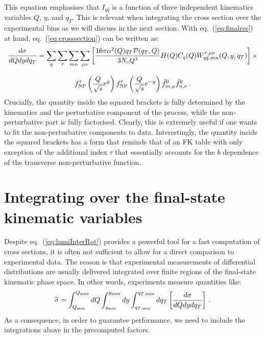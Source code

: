 \documentclass[10pt,a4paper]{article}
\begin{document}
This equation emphasises that $I_{q\bar{q}}$ is a function of three
independent kinematics variables $Q$, $y$, and $q_T$. This is relevant
when integrating the cross section over the experimental bins as we
will discuss in the next section. With eq.~(\ref{eq:finalres}) at
hand, eq.~(\ref{eq:crosssection}) can be written as:
\begin{equation}
\begin{array}{c}
\displaystyle   \frac{d\sigma}{dQ dy dq_T} =\sum_q\sum_\tau \sum_{mn}\sum_{\mu\nu}\left[
  \frac{16\pi\alpha^2(Q)q_T\mathcal{P}(q_T,Q)}{3N_c Q^3} H(Q) 
  C_q(Q) W_{q\bar{q},mn}^{\tau,\mu\nu}(Q,y,q_T)\right]\times\\
\\
\displaystyle f_{\rm NP}^\tau\left(\frac{Q}{\sqrt{s}}e^{y}\right)
  f_{\rm
  NP}^\tau\left(\frac{Q}{\sqrt{s}}e^{-y}\right)\hat{f}_{m,\mu}^0
  \hat{f}_{n,\nu}^0\,.
\end{array}
\end{equation}
Crucially, the quantity inside the squared brackets is fully
determined by the kinematics and the perturbative component of the
process, while the non-perturbative part is fully factorised. Clearly,
this is extremely useful if one wants to fit the non-perturbative
components to data. Interestingly, the quantity inside the squared
brackets has a form that reminds that of an FK table with only
exception of the additional index $\tau$ that essentially accounts for
the $b$ dependence of the transverse non-perturbative function.

\section{Integrating over the final-state kinematic variables}

Despite eq.~(\ref{eq:lumiInterRot}) provides a powerful tool for a
fast computation of cross sections, it is often not sufficient to
allow for a direct comparison to experimental data. The reason is that
experimental measurements of differential distributions are usually
delivered integrated over finite regions of the final-state kinematic
phase space. In other words, experiments measure quantities like:
\begin{equation}\label{eq:Intcrosssection}
\widetilde{\sigma}=\int_{Q_{\rm min}}^{Q_{\rm max}}dQ \int_{y_{\rm min}}^{y_{\rm max}}dy \int_{q_{T,\rm min}}^{q_{T,\rm max}}dq_T\left[\frac{d\sigma}{dQ dy dq_T} \right]\,.
\end{equation}
As a consequence, in order to guarantee performance, we need to
include the integrations above in the precomputed factors.
\end{document}
